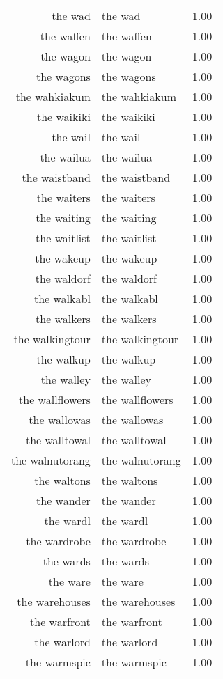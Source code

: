 \begin{table}[ht]
\begin{tabular}{rlr}
  the wad & the wad & 1.00 \\ 
  the waffen & the waffen & 1.00 \\ 
  the wagon & the wagon & 1.00 \\ 
  the wagons & the wagons & 1.00 \\ 
  the wahkiakum & the wahkiakum & 1.00 \\ 
  the waikiki & the waikiki & 1.00 \\ 
  the wail & the wail & 1.00 \\ 
  the wailua & the wailua & 1.00 \\ 
  the waistband & the waistband & 1.00 \\ 
  the waiters & the waiters & 1.00 \\ 
  the waiting & the waiting & 1.00 \\ 
  the waitlist & the waitlist & 1.00 \\ 
  the wakeup & the wakeup & 1.00 \\ 
  the waldorf & the waldorf & 1.00 \\ 
  the walkabl & the walkabl & 1.00 \\ 
  the walkers & the walkers & 1.00 \\ 
  the walkingtour & the walkingtour & 1.00 \\ 
  the walkup & the walkup & 1.00 \\ 
  the walley & the walley & 1.00 \\ 
  the wallflowers & the wallflowers & 1.00 \\ 
  the wallowas & the wallowas & 1.00 \\ 
  the walltowal & the walltowal & 1.00 \\ 
  the walnutorang & the walnutorang & 1.00 \\ 
  the waltons & the waltons & 1.00 \\ 
  the wander & the wander & 1.00 \\ 
  the wardl & the wardl & 1.00 \\ 
  the wardrobe & the wardrobe & 1.00 \\ 
  the wards & the wards & 1.00 \\ 
  the ware & the ware & 1.00 \\ 
  the warehouses & the warehouses & 1.00 \\ 
  the warfront & the warfront & 1.00 \\ 
  the warlord & the warlord & 1.00 \\ 
  the warmspic & the warmspic & 1.00 \\ 

\end{tabular}
\end{table}
